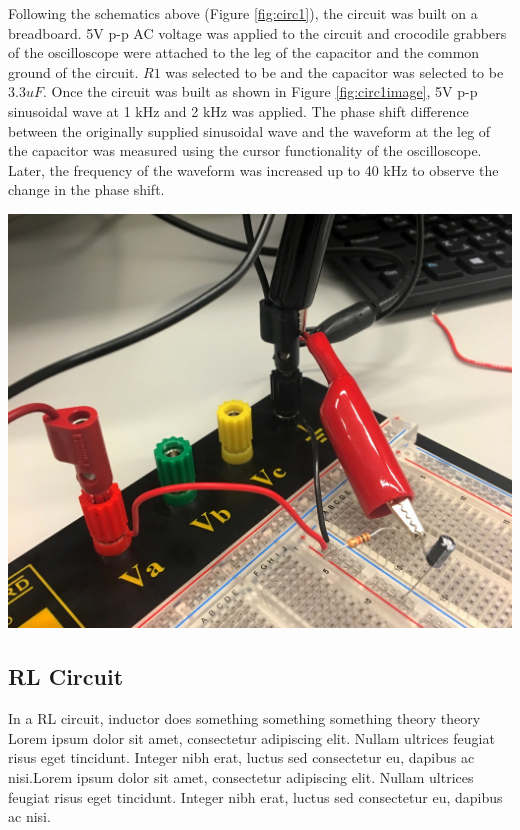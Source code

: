 \documentclass[journal]{IEEEtran}
\begin{document}
\noindent Following the schematics above (Figure \ref{fig:circ1}), the circuit was built on a breadboard. 5V p-p AC voltage was applied to the circuit and crocodile grabbers of the oscilloscope were attached to the leg of the capacitor and the common ground of the circuit. $R1$ was selected to be \ohm and the capacitor was selected to be 3.3$uF$. Once the circuit was built as shown in Figure \ref{fig:circ1image}, 5V p-p sinusoidal wave at 1 kHz and 2 kHz was applied. The phase shift difference between the originally supplied sinusoidal wave and the waveform at the leg of the capacitor was measured using the cursor functionality of the oscilloscope. Later, the frequency of the waveform was increased up to 40 kHz to observe the change in the phase shift.

\begingroup
    \centering
    \medskip
    \includegraphics[width=\columnwidth]{images/lab8_circ1.jpg}
    \label{fig:circ1image}
    \medskip
\endgroup



\subsection{RL Circuit}
\noindent In a RL circuit, inductor {\color{red}does something something something theory theory Lorem ipsum dolor sit amet, consectetur adipiscing elit. Nullam ultrices feugiat risus eget tincidunt. Integer nibh erat, luctus sed consectetur eu, dapibus ac nisi.Lorem ipsum dolor sit amet, consectetur adipiscing elit. Nullam ultrices feugiat risus eget tincidunt. Integer nibh erat, luctus sed consectetur eu, dapibus ac nisi.} 
\end{document}
